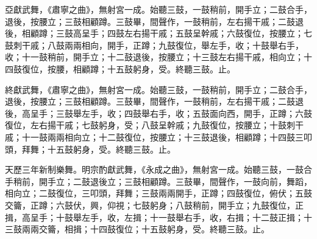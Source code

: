 \begin{pinyinscope}
 亞獻武舞，《肅寧之曲》，無射宮一成。始聽三鼓，一鼓稍前，開手立；二鼓合手，退後，按腰立；三鼓相顧蹲。三鼓畢，間聲作，一鼓稍前，左右揚干戚；二鼓退後，相顧蹲；三鼓高呈手；四鼓左右揚干戚；五鼓呈幹戚；六鼓復位，按腰立；七鼓刺干戚；八鼓兩兩相向，開手，正蹲；九鼓復位，舉左手，收；十鼓舉右手，收；十一鼓稍前，開手立；十二鼓退後，按腰立；十三鼓左右揚干戚，相向立；十四鼓復位，按腰，相顧蹲；十五鼓躬身，受。終聽三鼓。止。



 終獻武舞，《肅寧之曲》，無射宮一成。始聽三鼓，一鼓稍前，開手立；二鼓合手，退後，按腰立；三鼓相顧蹲。三鼓畢，間聲作，一鼓稍前，左右揚干戚；二鼓退後，高呈手；三鼓舉左手，收；四鼓舉右手，收；五鼓面向西，開手，正蹲；六鼓復位，左右揚干戚；七鼓躬身，受；八鼓呈幹戚；九鼓復位，按腰立；十鼓刺干戚；十一鼓兩兩相向立；十二鼓復位，按腰立；十三鼓退後，相顧蹲；十四鼓三叩頭，拜舞；十五鼓躬身，受。終聽三鼓。止。



 天歷三年新制樂舞。明宗酌獻武舞，《永成之曲》，無射宮一成。始聽三鼓，一鼓合手稍前，開手立；二鼓退後立；三鼓相顧蹲。三鼓畢，間聲作，一鼓向前，舞蹈，相向立；二鼓復位，三叩頭，拜舞；三鼓兩兩開手，正蹲；四鼓復位，俯伏；五鼓交籥，正蹲；六鼓伏，興，仰視；七鼓躬身；八鼓稍前，開手立；九鼓復位，正揖，高呈手；十鼓舉左手，收，左揖；十一鼓舉右手，收，右揖；十二鼓正揖；十三鼓兩兩交籥，相揖；十四鼓復位；十五鼓躬身，受。終聽三鼓。止。



\end{pinyinscope}